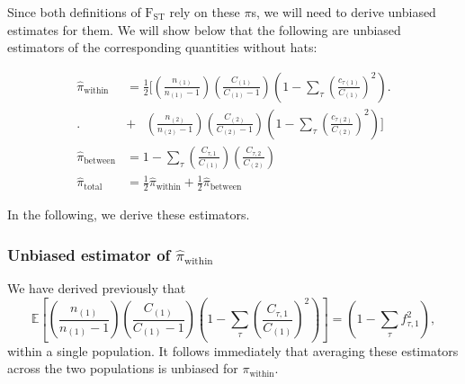 \documentclass[a4paper,9pt,DIV=14]{scrartcl}
\begin{document}
Since both definitions of $\text{F}_\text{ST}$ rely on these $\pi$s, we will need to derive unbiased estimates for them.
We will show below that the following are unbiased estimators of the corresponding quantities without hats:

\begin{align}
    \nonumber    
    \widehat{\pi}_\text{within} &= 
        \frac{1}{2} 
        \Bigg[                                 \left( \frac{n_{(1)}}{n_{(1)}-1} \right) \left( \frac{C_{(1)}}{C_{(1)}-1} \right) \left( 1 - \sum_{\tau} \left( \frac{c_{\tau(1)}}{C_{(1)}} \right)^2 \right) \Bigg. \\
        \Bigg. &+ \phantom{\frac{1}{2} \Bigg[} \left( \frac{n_{(2)}}{n_{(2)}-1} \right) \left( \frac{C_{(2)}}{C_{(2)}-1} \right) \left( 1 - \sum_{\tau} \left( \frac{c_{\tau(2)}}{C_{(2)}} \right)^2 \right) \Bigg] \\
    \widehat{\pi}_\text{between} &= 
        1 - \sum_{\tau} \left(\frac{C_{\tau,1}}{C_{(1)}}\right)\left(\frac{C_{\tau,2}}{C_{(2)}}\right)  \\
    \widehat{\pi}_\text{total} &= 
        \frac{1}{2}\widehat{\pi}_\text{within} + \frac{1}{2}\widehat{\pi}_\text{between}
\end{align}

In the following, we derive these estimators.


\subsubsection*{Unbiased estimator of \texorpdfstring{$\widehat{\pi}_\text{within}$}{Pi Within}}
\label{supp:sec:FST:sub:EstimatorsPi:sub:PiWithin}

We have derived previously that
\[
\mathbb{E}\left[\left(\frac{n_{(1)}}{n_{(1)}-1}\right)\left(\frac{C_{(1)}}{C_{(1)}-1}\right)\left(1 - \sum_{\tau}\left(\frac{C_{\tau,1}}{C_{(1)}}\right)^2\right) \right] = \left(1 - \sum_\tau f_{\tau, 1}^2\right),
\]
within a single population.  It follows immediately that averaging these estimators across the two populations is unbiased for $\pi_\text{within}$.
\end{document}
